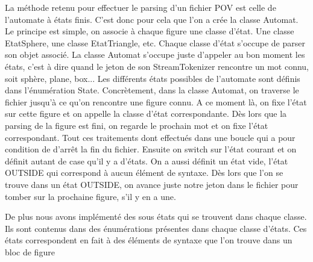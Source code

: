 \documentclass[../../Rapport RayTracer]{subfiles}
\begin{document}
La méthode retenu pour effectuer le parsing d'un fichier POV est celle de l'automate à états finis. C'est donc pour cela que l'on a crée la classe Automat. Le principe est simple, on associe à chaque figure une classe d'état. Une classe EtatSphere, une classe EtatTriangle, etc. Chaque classe d'état s'occupe de parser son objet associé. La classe Automat s'occupe juste d'appeler au bon moment les états, c'est à dire quand le jeton de son StreamTokenizer rencontre un mot connu, soit sphère, plane, box... Les différents états possibles de l'automate sont définis dans l'énumération State. Concrètement, dans la classe Automat, on traverse le fichier jusqu'à ce qu'on rencontre une figure connu. A ce moment là, on fixe l'état sur cette figure et on appelle la classe d'état correspondante. Dès lors que la parsing de la figure est fini, on regarde le prochain mot et on fixe l'état correspondant. Tout ces traitements dont effectués dans une boucle qui a pour condition de d'arrêt la fin du fichier. Ensuite on switch sur l'état courant et on définit autant de case qu'il y a d'états. On a aussi définit un état vide, l'état OUTSIDE qui correspond à aucun élément de syntaxe. Dès lors que l'on se trouve dans un état OUTSIDE, on avance juste notre jeton dans le fichier pour tomber sur la prochaine figure, s'il y en a une.

 
 
De plus nous avons implémenté des sous états qui se trouvent dans chaque classe. Ils sont contenus dans des énumérations présentes dans chaque classe d'états. Ces états correspondent en fait à des éléments de syntaxe que l'on trouve dans un bloc de figure
\end{document}

